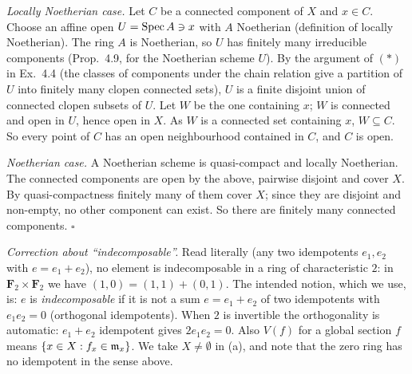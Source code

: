 \documentclass[11pt]{article}
\begin{document}
\emph{Locally Noetherian case.} Let $C$ be a connected component of $X$ and $x\in C$. Choose an affine open $U=\operatorname{Spec} A\ni x$ with $A$ Noetherian (definition of locally Noetherian). The ring $A$ is Noetherian, so $U$ has finitely many irreducible components (Prop.~4.9, for the Noetherian scheme $U$). By the argument of $(\ast)$ in Ex.~4.4 (the classes of components under the chain relation give a partition of $U$ into finitely many clopen connected sets), $U$ is a finite disjoint union of connected clopen subsets of $U$. Let $W$ be the one containing $x$; $W$ is connected and open in $U$, hence open in $X$. As $W$ is a connected set containing $x$, $W\subseteq C$. So every point of $C$ has an open neighbourhood contained in $C$, and $C$ is open.

\emph{Noetherian case.} A Noetherian scheme is quasi-compact and locally Noetherian. The connected components are open by the above, pairwise disjoint and cover $X$. By quasi-compactness finitely many of them cover $X$; since they are disjoint and non-empty, no other component can exist. So there are finitely many connected components. \hfill$\square$

\pf
\emph{Correction about ``indecomposable''.} Read literally (any two idempotents $e_1,e_2$ with $e=e_1+e_2$), no element is indecomposable in a ring of characteristic $2$: in $\mathbf F_2\times\mathbf F_2$ we have $(1,0)=(1,1)+(0,1)$. The intended notion, which we use, is: $e$ is \emph{indecomposable} if it is not a sum $e=e_1+e_2$ of two idempotents with $e_1e_2=0$ (orthogonal idempotents). When $2$ is invertible the orthogonality is automatic: $e_1+e_2$ idempotent gives $2e_1e_2=0$. Also $V(f)$ for a global section $f$ means $\{x\in X: f_x\in\mathfrak m_x\}$. We take $X\ne\emptyset$ in (a), and note that the zero ring has no idempotent in the sense above.
\end{document}
